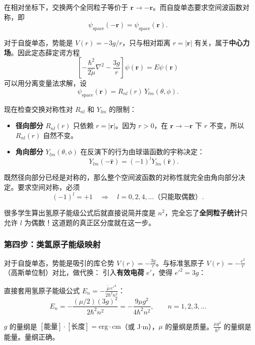 在相对坐标下，交换两个全同粒子等价于 $\bm{r} \to -\bm{r}$。而自旋单态要求空间波函数对称，即
\[
\psi_{\text{space}}(-\bm{r}) = \psi_{\text{space}}(\bm{r}).
\]

对于自旋单态，势能是 $V(r) = -3g/r$，只与相对距离 $r = |\bm{r}|$ 有关，属于\textbf{中心力场}。因此定态薛定谔方程
\[
\left[-\frac{\hbar^2}{2\tilde{\mu}}\nabla^2 - \frac{3g}{r}\right] \psi(\bm{r}) = E \psi(\bm{r})
\]
可以用分离变量法求解，设
\[
\psi_{\text{space}}(\bm{r}) = R_{nl}(r) \, Y_{lm}(\theta, \phi).
\]

现在检查交换对称性对 $R_{nl}$ 和 $Y_{lm}$ 的限制：
\begin{itemize}[nosep]
    \item \textbf{径向部分} $R_{nl}(r)$ 只依赖 $r = |\bm{r}|$。因为 $r>0$，在 $\bm{r} \to -\bm{r}$ 下 $r$ 不变，所以 $R_{nl}(r)$ 自然不变。
    \item \textbf{角向部分} $Y_{lm}(\theta, \phi)$ 在反演下的行为由球谐函数的宇称决定：
    \[
    Y_{lm}(-\hat{\bm{r}}) = (-1)^l Y_{lm}(\hat{\bm{r}}).
    \]
\end{itemize}

既然径向部分已经是对称的，那么整个空间波函数的对称性就完全由角向部分决定。要求空间对称，必须
\[
(-1)^l = +1 \quad \Longrightarrow \quad \boxed{l = 0, 2, 4, \dots \text{（只能取偶数）}}.
\]

\begin{warnbox}[90\% 的丢分点]
很多学生算出氢原子能级公式后就直接说简并度是 $n^2$，完全忘了\textbf{全同粒子统计}只允许 $l$ 为偶数！这道题的真正区分度就在这一步。
\end{warnbox}

\subsubsection{第四步：类氢原子能级映射}

对于自旋单态，势能是吸引的库仑势 $V(r) = -\frac{3g}{r}$。与标准氢原子 $V(r) = -\frac{e^2}{r}$（高斯单位制）对比，做代换：
引入\textbf{有效电荷} $e'$，使得 $e'^2 = 3g$：

直接套用氢原子能级公式 $E_n = -\frac{\tilde{\mu} \, e'^4}{2\hbar^2 n^2}$：
\[
E_n = -\frac{(\mu/2)(3g)^2}{2\hbar^2 n^2} = \boxed{-\frac{9\mu g^2}{4\hbar^2 n^2}}, \qquad n = 1, 2, 3, \dots
\]

\begin{tipbox}[量纲快速检查]
$g$ 的量纲是 $[\text{能量}] \cdot [\text{长度}] = \text{erg} \cdot \text{cm}$（或 J$\cdot$m），$\mu$ 的量纲是质量。$\frac{\mu g^2}{\hbar^2}$ 的量纲是能量。量纲正确。
\end{tipbox}

